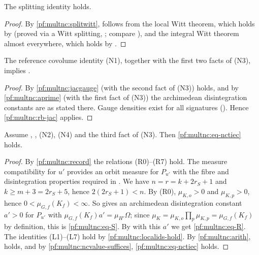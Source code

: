 \begin{theorem}\label{pf:multnc:splitom}
The splitting identity  holds.
\end{theorem}

\begin{proof}
By \cref{pf:multnc:splitwitt},  follows from the local Witt theorem, which holds by
 (proved via a Witt splitting,
; compare \cite{Jacobowitz1962}), and the integral Witt theorem almost
everywhere, which holds by .
\end{proof}

\begin{theorem}\label{pf:multnc:realbracket}
The reference covolume identity (N1), together with the first two facts of (N3), implies .
\end{theorem}

\begin{proof}
By \cref{pf:multnc:jacgauge} (with the second fact of (N3))  holds, and by \cref{pf:multnc:aprime} (with the
first fact of (N3)) the archimedean disintegration constants are as stated there. Gauge densities exist for all signatures
(). Hence \cref{pf:multnc:rb-jac} applies.
\end{proof}

\begin{proposition}\label{pf:multnc:nctieall}
Assume , , (N2), (N4) and the third fact of (N3). Then \eqref{pf:multnc:eq-nctiec} holds.
\end{proposition}

\begin{proof}
By \cref{pf:multnc:record} the relations (R0)--(R7) hold. The measure compatibility for $u'$ provides an orbit measure for
$P_{u'}$ with the fibre and disintegration properties required in . We have $n=r=k+2r_S+1$ and
$k\ge m+3=2r_S+5$, hence $2(2r_S+1)<n$. By (R0), $\mu_{K,o}>0$ and $\mu_{K,p}>0$, hence $0<\mu_{G,f}(K_f)<\infty$. So
 gives an archimedean disintegration constant $a'>0$ for $P_{u'}$ with $\mu_{G,f}(K_f)a'=\mu_{H'}\Omega$; since
$\mu_K=\mu_{K,o}\prod_p\mu_{K,p}=\mu_{G,f}(K_f)$ by definition, this is \eqref{pf:multnc:eq-S}. By  with this
$a'$ we get \eqref{pf:multnc:eq-R}. The identities (L1)--(L7) hold by \cref{pf:multnc:localids-hold}. By
\cref{pf:multnc:arith},  holds, and by \cref{pf:multnc:ncvalue-suffices}, \eqref{pf:multnc:eq-nctiec} holds.
\end{proof}

